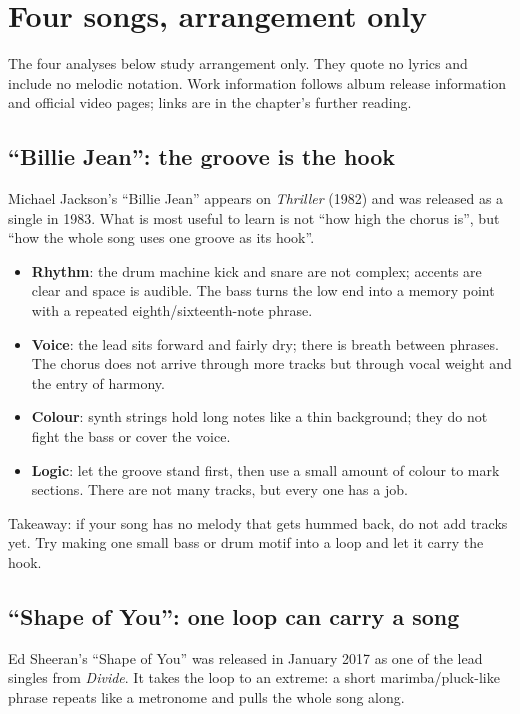 \section{Four songs, arrangement only}
\label{sec:pop-cases}

The four analyses below study arrangement only. They quote no lyrics and include no melodic notation. Work information follows album release information and official video pages; links are in the chapter's further reading.

\subsection{``Billie Jean'': the groove is the hook}
\label{sec:pop-case-billie-jean}

Michael Jackson's ``Billie Jean'' appears on \emph{Thriller} (1982) and was released as a single in 1983. What is most useful to learn is not ``how high the chorus is'', but ``how the whole song uses one groove as its hook''.

\begin{itemize}
\item \textbf{Rhythm}: the drum machine kick and snare are not complex; accents are clear and space is audible. The bass turns the low end into a memory point with a repeated eighth/sixteenth-note phrase.
\item \textbf{Voice}: the lead sits forward and fairly dry; there is breath between phrases. The chorus does not arrive through more tracks but through vocal weight and the entry of harmony.
\item \textbf{Colour}: synth strings hold long notes like a thin background; they do not fight the bass or cover the voice.
\item \textbf{Logic}: let the groove stand first, then use a small amount of colour to mark sections. There are not many tracks, but every one has a job.
\end{itemize}

Takeaway: if your song has no melody that gets hummed back, do not add tracks yet. Try making one small bass or drum motif into a loop and let it carry the hook.

\subsection{``Shape of You'': one loop can carry a song}
\label{sec:pop-case-shape}

Ed Sheeran's ``Shape of You'' was released in January 2017 as one of the lead singles from \emph{Divide}. It takes the loop to an extreme: a short marimba/pluck-like phrase repeats like a metronome and pulls the whole song along.

